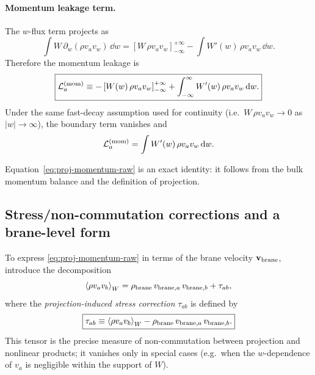 \documentclass[11pt]{article}
\begin{document}
\paragraph{Momentum leakage term.}
The $w$-flux term projects as
\begin{equation}
\int W\,\partial_w(\rho v_a v_w)\,\dd w
=
\left[ W\,\rho v_a v_w \right]_{-\infty}^{+\infty}
-
\int W'(w)\,\rho v_a v_w\,\dd w.
\end{equation}
Therefore the momentum leakage is
\begin{equation}
\boxed{
\mathcal{L}^{({\rm mom})}_a
\equiv
-\left[ W(w)\,\rho v_a v_w \right]_{-\infty}^{+\infty}
+
\int_{-\infty}^{\infty} W'(w)\,\rho v_a v_w\,\dd w.
}
\label{eq:proj-mom-leak}
\end{equation}
Under the same fast-decay assumption used for continuity (i.e.\ $W\,\rho v_a v_w\to 0$ as $|w|\to\infty$), the boundary term vanishes and
\begin{equation}
\mathcal{L}^{({\rm mom})}_a
=
\int W'(w)\,\rho v_a v_w\,\dd w.
\end{equation}

Equation~\eqref{eq:proj-momentum-raw} is an exact identity: it follows from the bulk momentum balance and the definition of projection.

\subsection{Stress/non-commutation corrections and a brane-level form}
\label{app:momentum-stress}

To express \eqref{eq:proj-momentum-raw} in terms of the brane velocity $\mathbf{v}_{\rm brane}$, introduce the decomposition
\begin{equation}
\left\langle \rho v_a v_b \right\rangle_W
=
\rho_{\rm brane}\,v_{{\rm brane},a}\,v_{{\rm brane},b}
+
\tau_{ab},
\label{eq:stress-decomp}
\end{equation}
where the \emph{projection-induced stress correction} $\tau_{ab}$ is defined by
\begin{equation}
\boxed{
\tau_{ab}
\equiv
\left\langle \rho v_a v_b \right\rangle_W
-
\rho_{\rm brane}\,v_{{\rm brane},a}\,v_{{\rm brane},b}.
}
\label{eq:tau-def}
\end{equation}
This tensor is the precise measure of non-commutation between projection and nonlinear products; it vanishes only in special cases (e.g.\ when the $w$-dependence of $v_a$ is negligible within the support of $W$).
\end{document}
